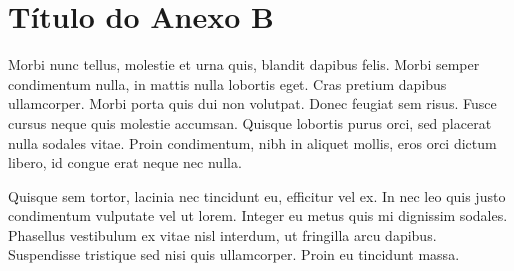 \chapter{Título do Anexo B}

Morbi nunc tellus, molestie et urna quis, blandit dapibus felis. Morbi semper condimentum nulla, in mattis nulla lobortis eget. Cras pretium dapibus ullamcorper. Morbi porta quis dui non volutpat. Donec feugiat sem risus. Fusce cursus neque quis molestie accumsan. Quisque lobortis purus orci, sed placerat nulla sodales vitae. Proin condimentum, nibh in aliquet mollis, eros orci dictum libero, id congue erat neque nec nulla.

Quisque sem tortor, lacinia nec tincidunt eu, efficitur vel ex. In nec leo quis justo condimentum vulputate vel ut lorem. Integer eu metus quis mi dignissim sodales. Phasellus vestibulum ex vitae nisl interdum, ut fringilla arcu dapibus. Suspendisse tristique sed nisi quis ullamcorper. Proin eu tincidunt massa.
